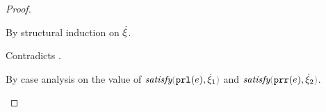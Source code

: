 \begin{proof}
\begin{byCases}
  \begin{pfsteps}
  \item {}  
  \end{pfsteps}  
  By structural induction on $\dot{\xi}$.
  \begin{byCases}
    \item[\hxi=\ctruth]
    \begin{pfsteps}
    \item {} 
    \end{pfsteps} 
    Contradicts .
    \item[\hxi=\cunknown]
    \begin{pfsteps}
    \item {} 
    \end{pfsteps} 
    \item[\hxi=\cnum{n}] 
    \begin{pfsteps}
    \item {} 
    \end{pfsteps} 
    \item[\hxi=\cinl{\hxi_1}]
    \begin{pfsteps}
    \item {} 
    \end{pfsteps} 
    \item[\hxi=\cinr{\hxi_2}]
    \begin{pfsteps}
    \item {} 
    \end{pfsteps} 
    \item[\hxi=\cpair{\hxi_1}{\hxi_2}]   
    \begin{pfsteps}
    \item {}  
    \item {}  
    \end{pfsteps}
    By case analysis on the value of $\fsatisfy{\hprl{e}}{\hxi_1}$ and $\fsatisfy{\hprr{e}}{\hxi_2}$.
    \begin{byCases}
      \item[\true, \true]

\end{byCases}
\end{byCases}
\end{byCases}
\end{proof}
